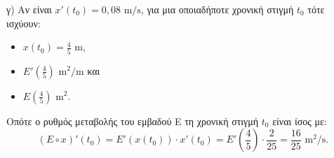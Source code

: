 \begin{alist}
\item γ) Αν είναι $x'(t_0) = 0,08 \text{ m/s}$, για μια οποιαδήποτε χρονική στιγμή $t_0$ τότε ισχύουν:
\begin{itemize}
\item $x(t_0) = \frac{4}{5} \text{ m}$,
\item $E'\left(\frac{4}{5}\right) \text{ m}^2/\text{m}$ και
\item $E\left(\frac{4}{5}\right) \text{ m}^2$.
\end{itemize}
Οπότε ο ρυθμός μεταβολής του εμβαδού Ε τη χρονική στιγμή $t_0$ είναι ίσος με:
\[ (E \circ x)'(t_0) = E'(x(t_0)) \cdot x'(t_0) = E'\left(\frac{4}{5}\right) \cdot \frac{2}{25} = \frac{16}{25} \text{ m}^2/\text{s}. \]
\end{alist}